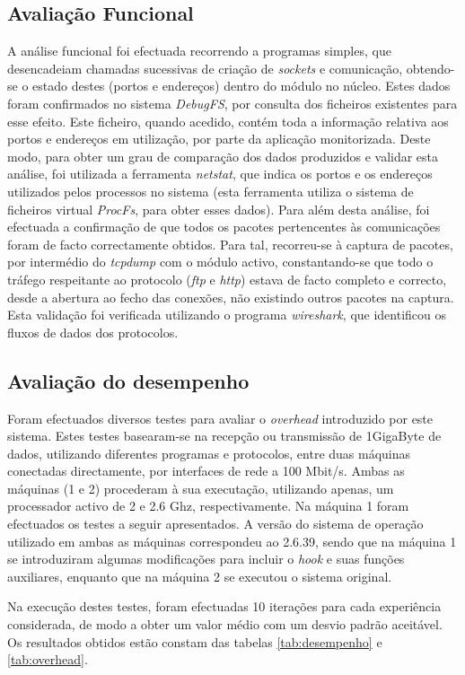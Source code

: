 \subsection{Avaliação Funcional}
A análise funcional foi efectuada recorrendo a programas simples, que desencadeiam chamadas sucessivas de criação de \textit{sockets} e comunicação, obtendo-se o estado destes (portos e endereços) dentro do módulo no núcleo.
 Estes dados foram confirmados no sistema \textit{DebugFS}, por consulta dos ficheiros existentes para esse efeito. Este ficheiro, quando acedido, contém toda a informação relativa aos portos e endereços em utilização, por parte da aplicação monitorizada.
 Deste modo, para obter um grau de comparação dos dados produzidos e validar esta análise, foi utilizada a ferramenta \textit{netstat}, que indica os portos e os endereços utilizados pelos processos no sistema (esta ferramenta utiliza o sistema de ficheiros virtual \textit{ProcFs}, para obter esses dados).
 Para além desta análise, foi efectuada a confirmação de que todos os pacotes pertencentes às comunicações foram de facto correctamente obtidos.
 Para tal, recorreu-se à captura de pacotes, por intermédio do \textit{tcpdump} com o módulo activo, constantando-se que todo o tráfego respeitante ao protocolo (\textit{ftp} e \textit{http}) estava de facto completo e correcto, desde a abertura ao fecho das conexões, não existindo outros pacotes na captura.
 Esta validação foi verificada utilizando o programa \textit{wireshark}, que identificou os fluxos de dados dos protocolos.

\subsection{Avaliação do desempenho}
Foram efectuados diversos testes para avaliar o \emph{overhead} introduzido por este sistema.
 Estes testes basearam-se na recepção ou transmissão de 1GigaByte de dados, utilizando diferentes programas e protocolos, entre duas máquinas conectadas directamente, por interfaces de rede a 100 Mbit/s.
 Ambas as máquinas (1 e 2) procederam à sua executação, utilizando apenas, um processador activo de 2 e 2.6 Ghz, respectivamente.
 Na máquina 1 foram efectuados os testes a seguir apresentados.
 A versão do sistema de operação utilizado em ambas as máquinas correspondeu ao 2.6.39, sendo que na máquina 1 se introduziram algumas modificações para incluir o \textit{hook} e suas funções auxiliares, enquanto que na máquina 2 se executou o sistema original.

Na execução destes testes, foram efectuadas 10 iterações para cada experiência considerada, de modo a obter um valor médio com um desvio padrão aceitável.
 Os resultados obtidos estão constam das tabelas \ref{tab:desempenho} e \ref{tab:overhead}.

